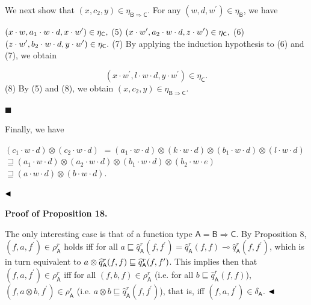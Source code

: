 We next show that $(x,c_{2},y)\in\eta_{\mathsf{B}\Rightarrow\mathsf{C}}$. For any $(w,d,w^{\prime})\in\eta_{\mathsf{B}}$, we have\par
    $\displaystyle(x\cdot w,a_{1}\cdot w\cdot d,x\cdot w^{\prime})\in\eta_{\mathsf{%
C}},$  (5)    $\displaystyle(x\cdot w^{\prime},a_{2}\cdot w\cdot d,z\cdot w^{\prime})\in\eta_%
{\mathsf{C}},$  (6)    $\displaystyle(z\cdot w^{\prime},b_{2}\cdot w\cdot d,y\cdot w^{\prime})\in\eta_%
{\mathsf{C}}.$  (7)   
By applying the induction hypothesis to (6) and (7), we obtain\par
    \[(x\cdot w^{\prime},l\cdot w\cdot d,y\cdot w^{\prime})\in\eta_{\mathsf{C}}.\]  (8)   
By (5) and (8), we obtain $(x,c_{2},y)\in\eta_{\mathsf{B}\Rightarrow\mathsf{C}}$.\par
 
 
 
\par\noindent  $\blacksquare$ 
 
Finally, we have\par
    $\displaystyle(c_{1}\cdot w\cdot d)\otimes(c_{2}\cdot w\cdot d)$ $\displaystyle=(a_{1}\cdot w\cdot d)\otimes(k\cdot w\cdot d)\otimes(b_{1}\cdot w%
\cdot d)\otimes(l\cdot w\cdot d)$      $\displaystyle\sqsupseteq(a_{1}\cdot w\cdot d)\otimes(a_{2}\cdot w\cdot d)%
\otimes(b_{1}\cdot w\cdot d)\otimes(b_{2}\cdot w\cdot e)$      $\displaystyle\sqsupseteq(a\cdot w\cdot d)\otimes(b\cdot w\cdot d).\ $    
 
  
$\hfill\blacktriangleleft$\par
 
 
 
 
\par\medskip\noindent\textbf{Proof of Proposition 18.}\par
 
 
The only interesting case is that of a function type $\mathsf{A}=\mathsf{B}\Rightarrow\mathsf{C}$. By Proposition 8, $(f,a,f^{\prime})\in\rho_{\mathsf{A}}^{r}$ holds iff for all $a\sqsubseteq\widehat{q}_{\mathsf{A}}^{r}(f,f^{\prime})=\widehat{q}_{\mathsf{A}%
}^{r}(f,f)\multimap\widehat{q}_{\mathsf{A}}^{r}(f,f^{\prime})$, which is in turn equivalent to $a\otimes\widehat{q}_{\mathsf{A}}^{r}(f,f)\sqsubseteq\widehat{q}_{\mathsf{A}}^{%
r}(f,f^{\prime})$. This implies then that $(f,a,f^{\prime})\in\rho_{\mathsf{A}}^{r}$ iff for all $(f,b,f)\in\rho_{\mathsf{A}}^{r}$ (i.e. for all $b\sqsubseteq\widehat{q}^{r}_{\mathsf{A}}(f,f)$), $(f,a\otimes b,f^{\prime})\in\rho_{\mathsf{A}}^{r}$ (i.e. $a\otimes b\sqsubseteq\widehat{q}^{r}_{\mathsf{A}}(f,f^{\prime})$), that is, iff $(f,a,f^{\prime})\in\delta_{\mathsf{A}}$. $\hfill\blacktriangleleft$\par
 
 
 
